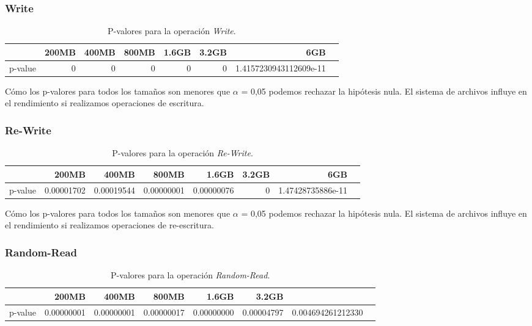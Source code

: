 \subsubsection{Write}
\begin{table}[!htp]\centering
\scriptsize
\begin{tabular}{lrrrrrrr}\toprule
&200MB &400MB &800MB &1.6GB &3.2GB &6GB \\\midrule
p-value &0 &0 &0 &0 &0 &1.4157230943112609e-11 \\
\bottomrule
\end{tabular}
\caption{P-valores para la operación \textit{Write}.}\label{tab: }
\end{table}

Cómo los p-valores para todos los tamaños son menores que $\alpha$ = 0,05 podemos rechazar la hipótesis nula. El sistema de archivos influye en el rendimiento si realizamos operaciones de escritura. 
\newpage
\subsubsection{Re-Write}
\begin{table}[!htp]\centering
\scriptsize
\begin{tabular}{lrrrrrrr}\toprule
&200MB &400MB &800MB &1.6GB &3.2GB &6GB \\\midrule
p-value &0.00001702 &0.00019544 &0.00000001 &0.00000076 &0 &1.47428735886e-11 \\
\bottomrule
\end{tabular}
\caption{P-valores para la operación \textit{Re-Write}.}\label{tab: }
\end{table}

Cómo los p-valores para todos los tamaños son menores que $\alpha$ = 0,05 podemos rechazar la hipótesis nula. El sistema de archivos influye en el rendimiento si realizamos operaciones de re-escritura. 

\subsubsection{Random-Read}
\begin{table}[!htp]\centering
\scriptsize
\begin{tabular}{lrrrrrrr}\toprule
&200MB &400MB &800MB &1.6GB &3.2GB \\\midrule
p-value &0.00000001 &0.00000001 &0.00000017 &0.00000000 &0.00004797 &0.004694261212330 \\
\bottomrule
\end{tabular}
\caption{P-valores para la operación \textit{Random-Read}.}\label{tab: }
\end{table}

